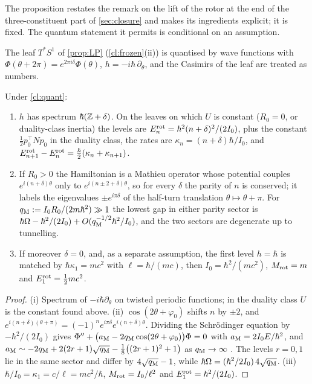 The proposition restates the remark on the lift of the rotor at the end of the three-constituent part of \cref{sec:closure} and makes its
ingredients explicit; it is fixed. The quantum statement it permits is conditional on an assumption.

\begin{assumption}
\label{cl:quant}
The leaf $T^*S^1$ of \cref{prop:LP} (\cref{cl:frozen}(ii)) is quantised by wave functions with $\Phi(\theta+2\pi)=e^{2\pi i\delta}\Phi(\theta)$, $h=-i\hbar\,\partial_\theta$,
and the Casimirs of the leaf are treated as numbers.
\end{assumption}

\begin{proposition}
\label{cl:ladder}
Under \cref{cl:quant}:
\begin{enumerate}[label=(\roman*),leftmargin=2.2em]
\item $h$ has spectrum $\hbar(\mathbb{Z}+\delta)$. On the leaves on which $U$ is constant ($R_0=0$, or duality-class inertia) the levels are
$E^{\rm rot}_n=\hbar^2(n+\delta)^2/(2I_0)$, plus the constant $\tfrac12p_0^{\!\top}Np_0$ in the duality class, the rates are
$\kappa_n=(n+\delta)\hbar/I_0$, and $E^{\rm rot}_{n+1}-E^{\rm rot}_n=\tfrac\hbar2(\kappa_n+\kappa_{n+1})$.
\item If $R_0>0$ the Hamiltonian is a Mathieu operator \cite{Mathieu,DLMF} whose potential couples $e^{i(n+\delta)\theta}$ only to
$e^{i(n\pm2+\delta)\theta}$, so for every $\delta$ the parity of $n$ is conserved; it labels the eigenvalues $\pm e^{i\pi\delta}$ of the half-turn
translation $\theta\mapsto\theta+\pi$. For $q_{\rm M}:=I_0R_0/(2m\hbar^2)\gg1$ the lowest gap in either parity sector is
$\hbar\Omega-\hbar^2/(2I_0)+O(q_{\rm M}^{-1/2}\hbar^2/I_0)$, and the two sectors are degenerate up to tunnelling.
\item If moreover $\delta=0$, and, as a separate assumption, the first level $h=\hbar$ is matched by $\hbar\kappa_1=mc^2$ with $\ell=\hbar/(mc)$, then
$I_0=\hbar^2/(mc^2)$, $M_{\rm rot}=m$ and $E^{\rm rot}_1=\tfrac12mc^2$.
\end{enumerate}
\end{proposition}

\begin{proof}
(i) Spectrum of $-i\hbar\partial_\theta$ on twisted periodic functions; in the duality class $U$ is the constant found above. (ii)
$\cos(2\theta+\varphi_0)$ shifts $n$ by $\pm2$, and $e^{i(n+\delta)(\theta+\pi)}=(-1)^ne^{i\pi\delta}e^{i(n+\delta)\theta}$. Dividing the Schr\"odinger
equation by $-\hbar^2/(2I_0)$ gives $\Phi''+\bigl(a_{\rm M}-2q_{\rm M}\cos(2\theta+\varphi_0)\bigr)\Phi=0$ with $a_{\rm M}=2I_0E/\hbar^2$, and
$a_{\rm M}\sim-2q_{\rm M}+2(2r+1)\sqrt{q_{\rm M}}-\tfrac18\bigl((2r+1)^2+1\bigr)$ as $q_{\rm M}\to\infty$ \cite[\S28.8]{DLMF}. The levels $r=0,1$ lie in
the same sector and differ by $4\sqrt{q_{\rm M}}-1$, while $\hbar\Omega=(\hbar^2/2I_0)\,4\sqrt{q_{\rm M}}$. (iii) $\hbar/I_0=\kappa_1=c/\ell=mc^2/\hbar$,
$M_{\rm rot}=I_0/\ell^2$ and $E^{\rm rot}_1=\hbar^2/(2I_0)$.
\end{proof}

